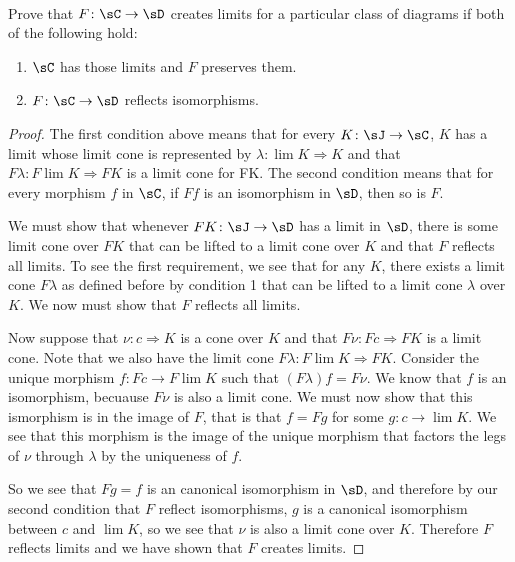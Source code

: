 \documentclass[main.tex]{subfiles}
\begin{document}
\paragraph{}
\begin{exercise}
Prove that $F\colon\sC \rightarrow \sD$ creates limits for a particular class of diagrams if both of the following hold:
\begin{enumerate}
    \item $\sC$ has those limits and $F$ preserves them.
    \item $F\colon \sC \rightarrow \sD$ reflects isomorphisms.
\end{enumerate}
\end{exercise}

\begin{proof}
The first condition above means that for every $K\colon \sJ \rightarrow \sC$, $K$ has a
limit whose limit cone is represented by $\lambda\colon\lim K \Rightarrow K$ and
that $F\lambda\colon F\lim K \Rightarrow FK$ is a limit cone for FK. The second
condition means that for every morphism $f$ in $\sC$, if $Ff$ is an isomorphism
in $\sD$, then so is $F$.

We must show that whenever $FK\colon \sJ \rightarrow \sD$ has a limit in $\sD$, there is
some limit cone over $FK$ that can be lifted to a limit cone over $K$ and that
$F$ reflects all limits. To see the first requirement, we see that for any $K$,
there exists a limit cone $F\lambda$ as defined before by condition 1 that can
be lifted to a limit cone $\lambda$ over $K$. We now must show that $F$
reflects all limits.

Now suppose that $\nu\colon c \Rightarrow K$ is a cone over $K$ and that $F\nu\colon Fc
\Rightarrow FK$ is a limit cone. Note that we also have the limit cone
$F\lambda\colon F\lim K \Rightarrow FK$. Consider the unique morphism $f:Fc
\rightarrow F\lim K$ such that $(F\lambda)f=F\nu$. We know that $f$ is an
isomorphism, becuause $F\nu$ is also a limit cone.  We must now show that this
ismorphism is in the image of $F$, that is that $f = Fg$ for some $g: c
\rightarrow \lim K$. We see that this morphism is the image of the unique
morphism that factors the legs of $\nu$ through $\lambda$ by the uniqueness of
$f$.

So we see that $Fg = f$ is an canonical isomorphism in $\sD$, and therefore by
our second condition that $F$ reflect isomorphisms, $g$ is a canonical
isomorphism between $c$ and $\lim K$, so we see that $\nu$ is also a limit cone
over $K$. Therefore $F$ reflects limits and we have shown that $F$ creates
limits.
\end{proof}
\end{document}
